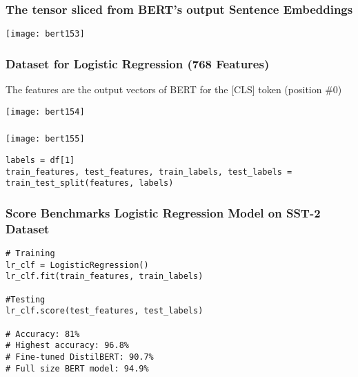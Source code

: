 \begin{frame}[fragile]\frametitle{The tensor sliced from BERT's output Sentence Embeddings}


			\begin{center}
			\texttt{[image: bert153]}
			\end{center}	


\end{frame}

\begin{frame}[fragile]\frametitle{Dataset for Logistic Regression (768 Features)}

The features are the output vectors of BERT for the [CLS] token (position \#0)

			\begin{center}
			\texttt{[image: bert154]}
			\end{center}	


\end{frame}

\begin{frame}[fragile]\frametitle{}

			\begin{center}
			\texttt{[image: bert155]}
			\end{center}	
			
\begin{lstlisting}
labels = df[1]
train_features, test_features, train_labels, test_labels = train_test_split(features, labels)
\end{lstlisting}





\end{frame}

\begin{frame}[fragile]\frametitle{Score Benchmarks Logistic Regression Model on SST-2 Dataset }

\begin{lstlisting}
# Training
lr_clf = LogisticRegression() 
lr_clf.fit(train_features, train_labels)

#Testing
lr_clf.score(test_features, test_labels)

# Accuracy: 81%
# Highest accuracy: 96.8%
# Fine-tuned DistilBERT: 90.7%
# Full size BERT model: 94.9%
\end{lstlisting}



\end{frame}

